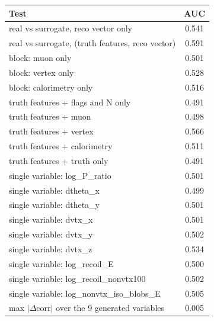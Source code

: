 \begin{tabular}{lc}
\toprule
Test & AUC \\
\midrule
real vs surrogate, reco vector only & 0.541 \\
real vs surrogate, (truth features, reco vector) & 0.591 \\
\midrule
block: muon only & 0.501 \\
block: vertex only & 0.528 \\
block: calorimetry only & 0.516 \\
truth features + flags and N only & 0.491 \\
truth features + muon & 0.498 \\
truth features + vertex & 0.566 \\
truth features + calorimetry & 0.511 \\
truth features + truth only & 0.491 \\
single variable: log\_P\_ratio & 0.501 \\
single variable: dtheta\_x & 0.499 \\
single variable: dtheta\_y & 0.501 \\
single variable: dvtx\_x & 0.501 \\
single variable: dvtx\_y & 0.502 \\
single variable: dvtx\_z & 0.534 \\
single variable: log\_recoil\_E & 0.500 \\
single variable: log\_recoil\_nonvtx100 & 0.502 \\
single variable: log\_nonvtx\_iso\_blobs\_E & 0.505 \\
\midrule
max $|\Delta$corr$|$ over the 9 generated variables & 0.005 \\
\bottomrule
\end{tabular}
